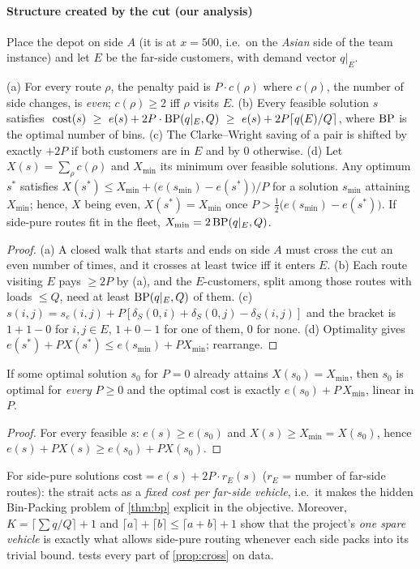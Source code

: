 \paragraph{Structure created by the cut (our analysis)}
Place the depot on side $A$ (it is at $x=500$, i.e.\ on the \emph{Asian} side of the team instance) and let
$E$ be the far-side customers, with demand vector $q|_E$.
\begin{proposition}\label{prop:cross}
(a) For every route $\rho$, the penalty paid is $P\cdot c(\rho)$ where $c(\rho)$, the number of side changes,
is \emph{even}; $c(\rho)\ge2$ iff $\rho$ visits $E$.
(b) Every feasible solution $s$ satisfies
$\;\mathrm{cost}(s)\ \ge\ e(s)+2P\cdot\BP(q|_E,Q)\ \ge\ e(s)+2P\lceil q(E)/Q\rceil$, where $\operatorname{BP}$ is the
optimal number of bins.
(c) The Clarke--Wright saving of a pair is shifted by exactly $+2P$ if both customers are in $E$ and by $0$
otherwise.
(d) Let $X(s)=\sum_\rho c(\rho)$ and $X_{\min}$ its minimum over feasible solutions. Any optimum $s^\ast$
satisfies $X(s^\ast)\le X_{\min}+\big(e(s_{\min})-e(s^\ast)\big)/P$ for a solution $s_{\min}$ attaining $X_{\min}$;
hence, $X$ being even, $X(s^\ast)=X_{\min}$ once $P>\tfrac12\big(e(s_{\min})-e(s^\ast)\big)$. If side-pure
routes fit in the fleet, $X_{\min}=2\operatorname{BP}(q|_E,Q)$.
\end{proposition}
\begin{proof}
(a) A closed walk that starts and ends on side $A$ must cross the cut an even number of times, and it
crosses at least twice iff it enters $E$. (b) Each route visiting $E$ pays $\ge2P$ by (a), and the
$E$-customers, split among those routes with loads $\le Q$, need at least $\operatorname{BP}(q|_E,Q)$ of them.
(c) $s(i,j)=s_e(i,j)+P[\delta_S(0,i)+\delta_S(0,j)-\delta_S(i,j)]$ and the bracket is $1+1-0$ for $i,j\in E$, $1+0-1$
for one of them, $0$ for none. (d) Optimality gives $e(s^\ast)+PX(s^\ast)\le e(s_{\min})+PX_{\min}$; rearrange.
\end{proof}
\begin{corollary}\label{cor:invariant}
If some optimal solution $s_0$ for $P=0$ already attains $X(s_0)=X_{\min}$, then $s_0$ is optimal for \emph{every}
$P\ge0$ and the optimal cost is exactly $e(s_0)+P\,X_{\min}$, linear in $P$.
\end{corollary}
\begin{proof}
For every feasible $s$: $e(s)\ge e(s_0)$ and $X(s)\ge X_{\min}=X(s_0)$, hence $e(s)+PX(s)\ge e(s_0)+PX(s_0)$.
\end{proof}
For side-pure solutions $\mathrm{cost}=e(s)+2P\cdot r_E(s)$ ($r_E$ = number of far-side routes): the
strait acts as a \emph{fixed cost per far-side vehicle}, i.e.\ it makes the hidden Bin-Packing problem of
\cref{thm:bp} explicit in the objective. Moreover, $K=\lceil\sum q/Q\rceil+1$ and
$\lceil a\rceil+\lceil b\rceil\le\lceil a+b\rceil+1$ show that the project's \emph{one spare vehicle} is exactly
what allows side-pure routing whenever each side packs into its trivial bound. 
tests every part of \cref{prop:cross} on data.

